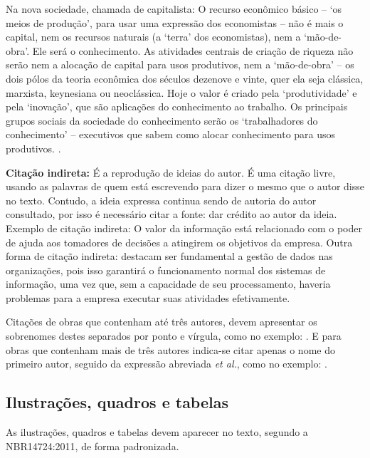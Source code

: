 \begin{citacao}
  Na nova sociedade, chamada de capitalista: O recurso econômico básico – ‘os meios de produção’, para usar uma expressão dos economistas – não é mais o capital, nem os recursos naturais (a ‘terra’ dos economistas), nem a ‘mão-de-obra’. Ele será o conhecimento. As atividades centrais de criação de riqueza não serão nem a alocação de capital para usos produtivos, nem a ‘mão-de-obra’ – os dois pólos da teoria econômica dos séculos dezenove e vinte, quer ela seja clássica, marxista, keynesiana ou neoclássica. Hoje o valor é criado pela ‘produtividade’ e pela ‘inovação’, que são aplicações do conhecimento ao trabalho. Os principais grupos sociais da sociedade do conhecimento serão os ‘trabalhadores do conhecimento’ – executivos que sabem como alocar conhecimento para usos produtivos. \cite[p. 48]{Pressman2009}.
\end{citacao}

\textbf{Citação indireta:} É a reprodução de ideias do autor. É uma citação livre, usando as palavras de quem está escrevendo para dizer o mesmo que o autor disse no texto. Contudo, a ideia expressa continua sendo de autoria do autor consultado, por isso é necessário citar a fonte: dar crédito ao autor da ideia. Exemplo de citação indireta: O valor da informação está relacionado com o poder de ajuda aos tomadores de decisões a atingirem os objetivos da empresa\cite{Pressman2009}. Outra forma de citação indireta:  destacam ser fundamental a gestão de dados nas organizações, pois isso garantirá o funcionamento normal dos sistemas de informação, uma vez que, sem a capacidade de seu processamento, haveria problemas para a empresa executar suas atividades efetivamente.

Citações de obras que contenham até três autores, devem apresentar os sobrenomes destes separados por ponto e vírgula, como no exemplo: \cite[p. 2]{Pinto2000}. E para obras que contenham mais de três autores indica-se citar apenas o nome do primeiro autor, seguido da expressão abreviada \textit{et al.}, como no exemplo: \cite{Guimaraes2003}.

\subsection{Ilustrações, quadros e tabelas}\label{subsec:ilustracoes}

As ilustrações, quadros e tabelas devem aparecer no texto, segundo a NBR14724:2011, de forma padronizada.

